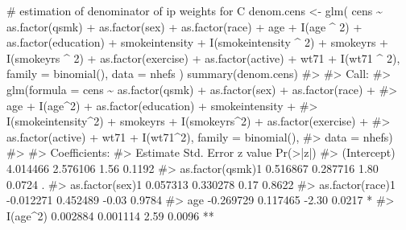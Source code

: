 \documentclass[
  10pt,
  a4paper,
]{book}
\newenvironment{Shaded}{\begin{snugshade}}{\end{snugshade}}
\newcommand{\AttributeTok}[1]{\textcolor[rgb]{0.40,0.45,0.13}{#1}}
\newcommand{\CommentTok}[1]{\textcolor[rgb]{0.37,0.37,0.37}{#1}}
\newcommand{\DecValTok}[1]{\textcolor[rgb]{0.68,0.00,0.00}{#1}}
\newcommand{\FunctionTok}[1]{\textcolor[rgb]{0.28,0.35,0.67}{#1}}
\newcommand{\NormalTok}[1]{\textcolor[rgb]{0.00,0.46,0.62}{#1}}
\newcommand{\OtherTok}[1]{\textcolor[rgb]{0.00,0.46,0.62}{#1}}
\newcommand{\SpecialCharTok}[1]{\textcolor[rgb]{0.37,0.37,0.37}{#1}}
\begin{document}
\begin{Shaded}
\begin{Highlighting}[]
\CommentTok{\# estimation of denominator of ip weights for C}
\NormalTok{denom.cens }\OtherTok{\textless{}{-}} \FunctionTok{glm}\NormalTok{(}
\NormalTok{  cens }\SpecialCharTok{\textasciitilde{}} \FunctionTok{as.factor}\NormalTok{(qsmk) }\SpecialCharTok{+} \FunctionTok{as.factor}\NormalTok{(sex) }\SpecialCharTok{+}
    \FunctionTok{as.factor}\NormalTok{(race) }\SpecialCharTok{+}\NormalTok{ age }\SpecialCharTok{+} \FunctionTok{I}\NormalTok{(age }\SpecialCharTok{\^{}} \DecValTok{2}\NormalTok{) }\SpecialCharTok{+}
    \FunctionTok{as.factor}\NormalTok{(education) }\SpecialCharTok{+}\NormalTok{ smokeintensity }\SpecialCharTok{+}
    \FunctionTok{I}\NormalTok{(smokeintensity }\SpecialCharTok{\^{}} \DecValTok{2}\NormalTok{) }\SpecialCharTok{+}\NormalTok{ smokeyrs }\SpecialCharTok{+} \FunctionTok{I}\NormalTok{(smokeyrs }\SpecialCharTok{\^{}} \DecValTok{2}\NormalTok{) }\SpecialCharTok{+}
    \FunctionTok{as.factor}\NormalTok{(exercise) }\SpecialCharTok{+} \FunctionTok{as.factor}\NormalTok{(active) }\SpecialCharTok{+}\NormalTok{ wt71 }\SpecialCharTok{+} \FunctionTok{I}\NormalTok{(wt71 }\SpecialCharTok{\^{}} \DecValTok{2}\NormalTok{),}
  \AttributeTok{family =} \FunctionTok{binomial}\NormalTok{(),}
  \AttributeTok{data =}\NormalTok{ nhefs}
\NormalTok{)}
\FunctionTok{summary}\NormalTok{(denom.cens)}
\CommentTok{\#\textgreater{} }
\CommentTok{\#\textgreater{} Call:}
\CommentTok{\#\textgreater{} glm(formula = cens \textasciitilde{} as.factor(qsmk) + as.factor(sex) + as.factor(race) + }
\CommentTok{\#\textgreater{}     age + I(age\^{}2) + as.factor(education) + smokeintensity + }
\CommentTok{\#\textgreater{}     I(smokeintensity\^{}2) + smokeyrs + I(smokeyrs\^{}2) + as.factor(exercise) + }
\CommentTok{\#\textgreater{}     as.factor(active) + wt71 + I(wt71\^{}2), family = binomial(), }
\CommentTok{\#\textgreater{}     data = nhefs)}
\CommentTok{\#\textgreater{} }
\CommentTok{\#\textgreater{} Coefficients:}
\CommentTok{\#\textgreater{}                        Estimate Std. Error z value Pr(\textgreater{}|z|)   }
\CommentTok{\#\textgreater{} (Intercept)            4.014466   2.576106    1.56   0.1192   }
\CommentTok{\#\textgreater{} as.factor(qsmk)1       0.516867   0.287716    1.80   0.0724 . }
\CommentTok{\#\textgreater{} as.factor(sex)1        0.057313   0.330278    0.17   0.8622   }
\CommentTok{\#\textgreater{} as.factor(race)1      {-}0.012271   0.452489   {-}0.03   0.9784   }
\CommentTok{\#\textgreater{} age                   {-}0.269729   0.117465   {-}2.30   0.0217 * }
\CommentTok{\#\textgreater{} I(age\^{}2)               0.002884   0.001114    2.59   0.0096 **}

\end{Highlighting}
\end{Shaded}
\end{document}
